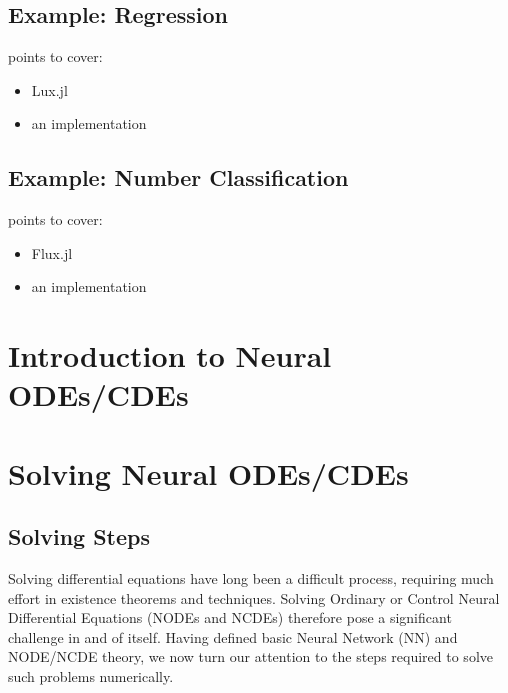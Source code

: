 \documentclass[a4paper,11pt, titlepage]{article}
\theoremstyle{definition}
\theoremstyle{plain}
\theoremstyle{remark}
\begin{document}
\subsection{Example: Regression}
points to cover:
\begin{itemize}
    \item Lux.jl
    \item an implementation
\end{itemize}

\subsection{Example: Number Classification}
points to cover:
\begin{itemize}
    \item Flux.jl
    \item an implementation
\end{itemize}

\section{Introduction to Neural ODEs/CDEs}

\section{Solving Neural ODEs/CDEs}

\subsection{Solving Steps}

Solving differential equations have long been a difficult process, requiring much effort in existence theorems and techniques. Solving Ordinary or Control Neural Differential Equations (NODEs and NCDEs) therefore pose a significant challenge in and of itself. Having defined basic Neural Network (NN) and NODE/NCDE theory, we now turn our attention to the steps required to solve such problems numerically.
\end{document}
